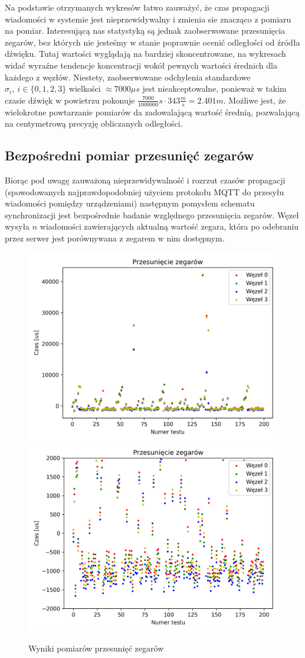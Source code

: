 Na podstawie otrzymanych wykresów łatwo zauważyć, że czas propagacji wiadomości w systemie jest nieprzewidywalny i zmienia sie znacząco z pomiaru na pomiar. Interesującą nas statystyką są jednak zaobserwowane przesunięcia zegarów, bez których nie jesteśmy w stanie poprawnie ocenić odległości od źródła dźwięku. Tutaj wartości wyglądają na bardziej skoncentrowane, na wykresach widać wyraźne tendencje koncentracji wokół pewnych wartości średnich dla każdego z węzłów. Niestety, zaobserwowane odchylenia standardowe $\sigma_i,\ i \in \{0,1,2,3\}$ wielkości $\approx 7000 \mu s$ jest nieakceptowalne, ponieważ w takim czasie dźwięk w powietrzu pokonuje $\frac{7000}{1000000}s \cdot 343\frac{m}{s} = 2.401m$. Możliwe jest, że wielokrotne powtarzanie pomiarów da zadowalającą wartość średnią, pozwalającą na centymetrową precyzję obliczanych odległości.

\subsection{Bezpośredni pomiar przesunięć zegarów}

Biorąc pod uwagę zauważoną nieprzewidywalność i rozrzut czasów propagacji (spowodowanych najprawdopodobniej użyciem protokołu MQTT do przesyłu wiadomości pomiędzy urządzeniami) następnym pomysłem schematu synchronizacji jest bezpośrednie badanie względnego przesunięcia zegarów. Węzeł wysyła $n$ wiadomości zawierających aktualną wartość zegara, która po odebraniu przez serwer jest porównywana z zegarem w nim dostępnym.

\begin{figure}[h]
\centering
    \includegraphics[width=.49\textwidth]{pics/time_deltas/time_deltas.png}
    \includegraphics[width=.49\textwidth]{pics/time_deltas/time_deltas_close.png}
\caption{Wyniki pomiarów przesunięć zegarów}
\label{pic:offsets_ntp}
\end{figure}

